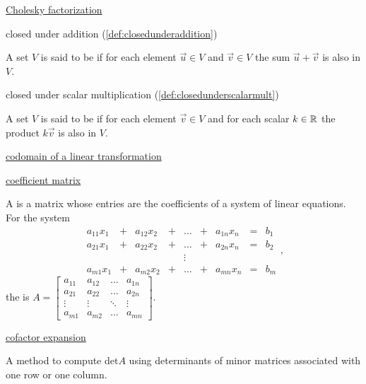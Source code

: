 \documentclass{ximera}
\begin{document}
\href{https://ximera.osu.edu/oerlinalg/LinearAlgebra/RTH-0045/main}{Cholesky factorization}

closed under addition (\ref{def:closedunderaddition})
\begin{expandable}
    A set $V$ is said to be  if for each element $\vec{u} \in V$ and $\vec{v} \in V$ the sum $\vec{u}+\vec{v}$ is also in $V$.
\end{expandable}

closed under scalar multiplication (\ref{def:closedunderscalarmult})
\begin{expandable}
    A set $V$ is said to be  if for each element $\vec{v} \in V$  and for each scalar $k \in \mathbb{R}$ the product $k\vec{v}$ is also in $V$.
\end{expandable}

\href{https://ximera.osu.edu/oerlinalg/LinearAlgebra/LTR-0010/main}{codomain of a linear transformation}

\href{https://ximera.osu.edu/oerlinalg/LinearAlgebra/SYS-0020/main}{coefficient matrix}
\begin{expandable}
    A  is a matrix whose entries are the coefficients of a system of linear equations.  For the system $$\begin{array}{ccccccccc}
      a_{11}x_1 &+ &a_{12}x_2&+&\ldots&+&a_{1n}x_n&= &b_1 \\
	 a_{21}x_1 &+ &a_{22}x_2&+&\ldots&+&a_{2n}x_n&= &b_2 \\
     &&&&\vdots&&&& \\
     a_{m1}x_1 &+ &a_{m2}x_2&+&\ldots&+&a_{mn}x_n&= &b_m
    \end{array},$$ 
    the  is $A=\begin{bmatrix}a_{11}&a_{12}&\ldots&a_{1n}\\a_{21}&a_{22}&\ldots&a_{2n}\\\vdots&\vdots&\ddots&\vdots\\a_{m1}&a_{m2}&\ldots&a_{mn}\end{bmatrix}$.
\end{expandable}

\href{https://ximera.osu.edu/oerlinalg/LinearAlgebra/DET-0010/main}{cofactor expansion}
\begin{expandable}
    A method to compute $\mbox{det} A$ using determinants of minor matrices associated with one row or one column.
\end{expandable}
\end{document}
